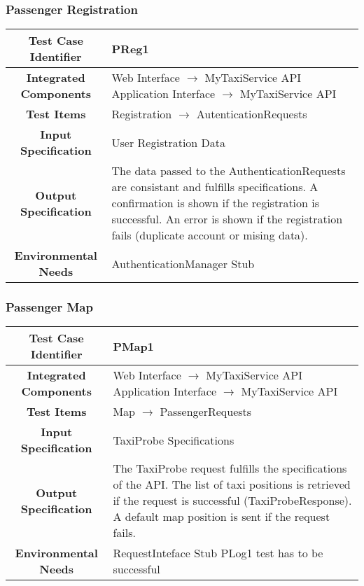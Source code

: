 \documentclass[11pt, a4paper,titlepage]{article}
\begin{document}
	\subsubsection{Passenger Registration}
	\begin{tabularx}{\textwidth}{| c|X|}
		\hline \textbf{Test Case Identifier} & \label{PReg1}PReg1 \\
		\hline \textbf{Integrated Components} &  Web Interface $\rightarrow $ MyTaxiService API \newline 
		Application Interface $\rightarrow $ MyTaxiService API \\
		\hline \textbf{Test Items} & Registration $\rightarrow $ AutenticationRequests \\
		\hline \textbf{Input Specification} & User Registration Data \\
		\hline \textbf{Output Specification} & 
		The data passed to the AuthenticationRequests are consistant and fulfills specifications.\newline
		A confirmation is shown if the registration is successful.\newline
		An error is shown if the registration fails (duplicate account or mising data). \\
		\hline \textbf{Environmental Needs} & AuthenticationManager Stub \\
		\hline
	\end{tabularx}
	\newline
	\newline
	\subsubsection{Passenger Map}
	\begin{tabularx}{\textwidth}{| c|X|}
		\hline \textbf{Test Case Identifier} & \label{PMap1}PMap1 \\
		\hline \textbf{Integrated Components} &  Web Interface $\rightarrow $ MyTaxiService API \newline 
		Application Interface $\rightarrow $ MyTaxiService API \\
		\hline \textbf{Test Items} & Map $\rightarrow $ PassengerRequests \\
		\hline \textbf{Input Specification} & TaxiProbe Specifications \\
		\hline \textbf{Output Specification} & 
		The TaxiProbe request fulfills the specifications of the API.\newline	
		The list of taxi positions is retrieved if the request is successful (TaxiProbeResponse).\newline
		A default map position is sent if the request fails.  \\
		\hline \textbf{Environmental Needs} & RequestInteface Stub \newline PLog1 test has to be successful \\
		\hline
	\end{tabularx}
	\newline
	\newline
\end{document}
